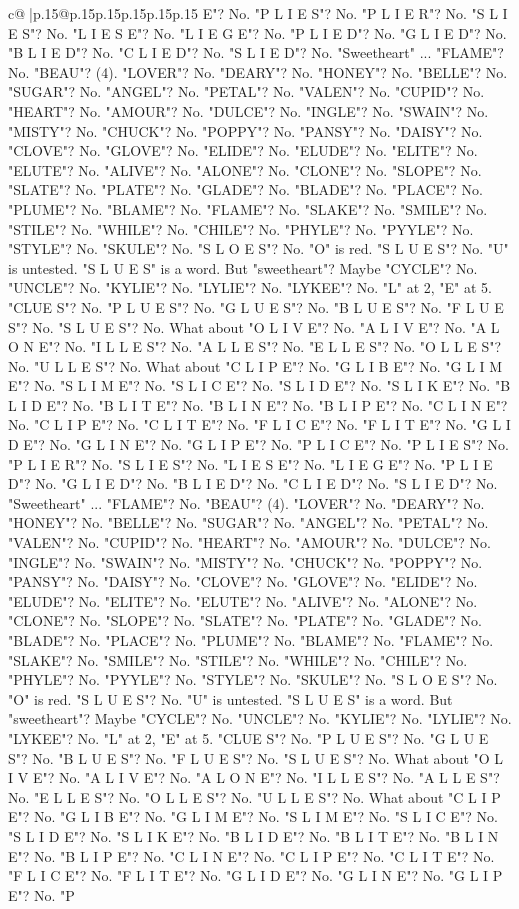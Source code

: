\documentclass{article}
\begin{document}
{\begin{supertabular}{c@{$\;$}|p{.15\linewidth}@{}p{.15\linewidth}p{.15\linewidth}p{.15\linewidth}p{.15\linewidth}p{.15\linewidth}}
{{{E"? No. "P L I E S"? No. "P L I E R"? No. "S L I E S"? No. "L I E S E"? No. "L I E G E"? No. "P L I E D"? No. "G L I E D"? No. "B L I E D"? No. "C L I E D"? No. "S L I E D"? No. "Sweetheart" ... "FLAME"? No. "BEAU"? (4). "LOVER"? No. "DEARY"? No. "HONEY"? No. "BELLE"? No. "SUGAR"? No. "ANGEL"? No. "PETAL"? No. "VALEN"? No. "CUPID"? No. "HEART"? No. "AMOUR"? No. "DULCE"? No. "INGLE"? No. "SWAIN"? No. "MISTY"? No. "CHUCK"? No. "POPPY"? No. "PANSY"? No. "DAISY"? No. "CLOVE"? No. "GLOVE"? No. "ELIDE"? No. "ELUDE"? No. "ELITE"? No. "ELUTE"? No. "ALIVE"? No. "ALONE"? No. "CLONE"? No. "SLOPE"? No. "SLATE"? No. "PLATE"? No. "GLADE"? No. "BLADE"? No. "PLACE"? No. "PLUME"? No. "BLAME"? No. "FLAME"? No. "SLAKE"? No. "SMILE"? No. "STILE"? No. "WHILE"? No. "CHILE"? No. "PHYLE"? No. "PYYLE"? No. "STYLE"? No. "SKULE"? No. "S L O E S"? No. "O" is red. "S L U E S"? No. "U" is untested. "S L U E S" is a word. But "sweetheart"? Maybe "CYCLE"? No. "UNCLE"? No. "KYLIE"? No. "LYLIE"? No. "LYKEE"? No. "L" at 2, "E" at 5. "CLUE S"? No. "P L U E S"? No. "G L U E S"? No. "B L U E S"? No. "F L U E S"? No. "S L U E S"? No. What about "O L I V E"? No. "A L I V E"? No. "A L O N E"? No. "I L L E S"? No. "A L L E S"? No. "E L L E S"? No. "O L L E S"? No. "U L L E S"? No. What about "C L I P E"? No. "G L I B E"? No. "G L I M E"? No. "S L I M E"? No. "S L I C E"? No. "S L I D E"? No. "S L I K E"? No. "B L I D E"? No. "B L I T E"? No. "B L I N E"? No. "B L I P E"? No. "C L I N E"? No. "C L I P E"? No. "C L I T E"? No. "F L I C E"? No. "F L I T E"? No. "G L I D E"? No. "G L I N E"? No. "G L I P E"? No. "P L I C E"? No. "P L I E S"? No. "P L I E R"? No. "S L I E S"? No. "L I E S E"? No. "L I E G E"? No. "P L I E D"? No. "G L I E D"? No. "B L I E D"? No. "C L I E D"? No. "S L I E D"? No. "Sweetheart" ... "FLAME"? No. "BEAU"? (4). "LOVER"? No. "DEARY"? No. "HONEY"? No. "BELLE"? No. "SUGAR"? No. "ANGEL"? No. "PETAL"? No. "VALEN"? No. "CUPID"? No. "HEART"? No. "AMOUR"? No. "DULCE"? No. "INGLE"? No. "SWAIN"? No. "MISTY"? No. "CHUCK"? No. "POPPY"? No. "PANSY"? No. "DAISY"? No. "CLOVE"? No. "GLOVE"? No. "ELIDE"? No. "ELUDE"? No. "ELITE"? No. "ELUTE"? No. "ALIVE"? No. "ALONE"? No. "CLONE"? No. "SLOPE"? No. "SLATE"? No. "PLATE"? No. "GLADE"? No. "BLADE"? No. "PLACE"? No. "PLUME"? No. "BLAME"? No. "FLAME"? No. "SLAKE"? No. "SMILE"? No. "STILE"? No. "WHILE"? No. "CHILE"? No. "PHYLE"? No. "PYYLE"? No. "STYLE"? No. "SKULE"? No. "S L O E S"? No. "O" is red. "S L U E S"? No. "U" is untested. "S L U E S" is a word. But "sweetheart"? Maybe "CYCLE"? No. "UNCLE"? No. "KYLIE"? No. "LYLIE"? No. "LYKEE"? No. "L" at 2, "E" at 5. "CLUE S"? No. "P L U E S"? No. "G L U E S"? No. "B L U E S"? No. "F L U E S"? No. "S L U E S"? No. What about "O L I V E"? No. "A L I V E"? No. "A L O N E"? No. "I L L E S"? No. "A L L E S"? No. "E L L E S"? No. "O L L E S"? No. "U L L E S"? No. What about "C L I P E"? No. "G L I B E"? No. "G L I M E"? No. "S L I M E"? No. "S L I C E"? No. "S L I D E"? No. "S L I K E"? No. "B L I D E"? No. "B L I T E"? No. "B L I N E"? No. "B L I P E"? No. "C L I N E"? No. "C L I P E"? No. "C L I T E"? No. "F L I C E"? No. "F L I T E"? No. "G L I D E"? No. "G L I N E"? No. "G L I P E"? No. "P }}}
\end{supertabular}}
\end{document}

